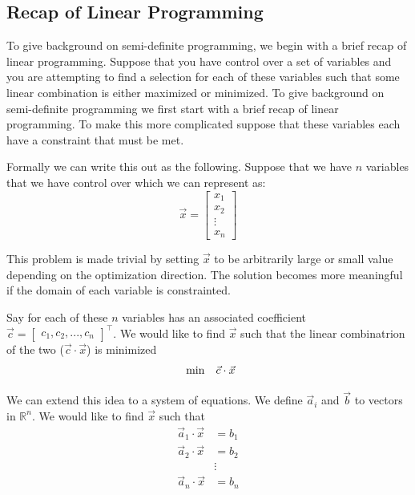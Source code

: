 \documentclass{article}
\begin{document}
\subsection{Recap of Linear Programming}
To give background on semi-definite programming, we begin with a brief recap of linear programming.
Suppose that you have control over a set of variables and you are attempting to find a selection for each of these variables such that some linear combination is either maximized or minimized.
To give background on semi-definite programming we first start with a brief recap of linear programming.
To make this more complicated suppose that these variables each have a constraint that must be met.

Formally we can write this out as the following. Suppose that we have \( n \) variables that we have control over which we can represent as:
\[
\vec{x} = \begin{bmatrix} x_1 \\ x_2 \\ \vdots \\ x_n \end{bmatrix}
\]

This problem is made trivial by setting \( \vec{x} \) to be arbitrarily large or small value depending on the optimization direction.
The solution becomes more meaningful if the domain of each variable is constrainted.

Say for each of these \( n \) variables has an associated coefficient \( \vec{c} = \begin{bmatrix} c_1, c_2, ..., c_n  \end{bmatrix}^\top \).
We would like to find \( \vec{x} \) such that the linear combinatrion of the two (\( \vec{c} \cdot \vec{x} \)) is minimized
\begin{align*}
  \begin{array}{ll@{}ll}
  \min  & \vec{c} \cdot \vec{x}
  \end{array}
\end{align*}

We can extend this idea to a system of equations. We define \( \vec{a}_i \) and \( \vec{b} \) to vectors in $\mathbb{R}^n$. We would like to find \( \vec{x} \) such that
\begin{align*}
\vec{a}_1 \cdot \vec{x} &= b_1 \\
\vec{a}_2 \cdot \vec{x} &= b_2 \\
& \vdots  \\
\vec{a}_n \cdot \vec{x} &= b_n \\
\end{align*}
\end{document}
